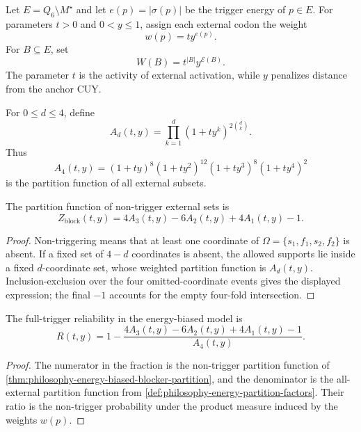 \begin{definition}
\label{def:philosophy-energy-biased-trigger-weights}
Let $E=Q_{6}\setminus M^{\star}$ and let
$e(p)=|\sigma(p)|$ be the trigger energy of $p\in E$. For parameters
$t>0$ and $0<y\leq 1$, assign each external codon the weight
$$
  w(p)=t y^{e(p)}.
$$
For $B\subseteq E$, set
$$
  W(B)=t^{|B|}y^{\mathcal{E}(B)}.
$$
The parameter $t$ is the activity of external activation, while $y$
penalizes distance from the anchor $\mathrm{CUY}$.
\end{definition}

\begin{definition}
\label{def:philosophy-energy-partition-factors}
For $0\leq d\leq 4$, define
$$
  A_{d}(t,y)
  =
  \prod_{k=1}^{d}
  (1+t y^{k})^{2\binom{d}{k}}.
$$
Thus
$$
  A_{4}(t,y)
  =
  (1+ty)^{8}
  (1+ty^{2})^{12}
  (1+ty^{3})^{8}
  (1+ty^{4})^{2}
$$
is the partition function of all external subsets.
\end{definition}

\begin{theorem}
\label{thm:philosophy-energy-biased-blocker-partition}
The partition function of non-trigger external sets is
$$
  Z_{\mathrm{block}}(t,y)
  =
  4A_{3}(t,y)-6A_{2}(t,y)+4A_{1}(t,y)-1.
$$
\end{theorem}
\begin{proof}
Non-triggering means that at least one coordinate of
$\Omega=\{s_{1},f_{1},s_{2},f_{2}\}$ is absent. If a fixed set of
$4-d$ coordinates is absent, the allowed supports lie inside a fixed
$d$-coordinate set, whose weighted partition function is $A_{d}(t,y)$.
Inclusion-exclusion over the four omitted-coordinate events gives the
displayed expression; the final $-1$ accounts for the empty four-fold
intersection.
\end{proof}

\begin{theorem}
\label{thm:philosophy-energy-biased-reliability}
The full-trigger reliability in the energy-biased model is
$$
  R(t,y)
  =
  1-
  \frac{
  4A_{3}(t,y)-6A_{2}(t,y)+4A_{1}(t,y)-1
  }{
  A_{4}(t,y)
  }.
$$
\end{theorem}
\begin{proof}
The numerator in the fraction is the non-trigger partition function of
\autoref{thm:philosophy-energy-biased-blocker-partition}, and the
denominator is the all-external partition function from
\autoref{def:philosophy-energy-partition-factors}. Their ratio is the
non-trigger probability under the product measure induced by the
weights $w(p)$.
\end{proof}

